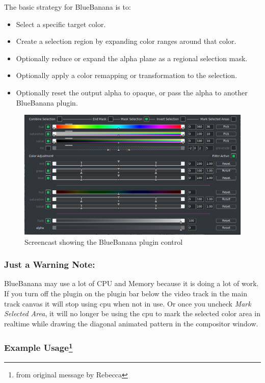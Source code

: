 The basic strategy for BlueBanana is to:

\begin{itemize}
    \item Select a specific target color.
    \item Create a selection region by expanding color ranges around that color.
    \item Optionally reduce or expand the alpha plane as a regional selection mask.
    \item Optionally apply a color remapping or transformation to the selection.
    \item Optionally reset the output alpha to opaque, or pass the alpha to another BlueBanana plugin.
\end{itemize}

\begin{figure}[htpb]
    \centering
    \includegraphics[width=1.0\linewidth]{images/bluebanana.png}
    \caption{Screencast showing the BlueBanana plugin control}
    \label{fig:bluebanana}
\end{figure}

\subsubsection*{Just a Warning Note:}
\label{ssub:warning_note}
BlueBanana may use a lot of CPU and Memory because it is doing a lot of work. If you turn off the plugin on the plugin bar below the video track in the main track canvas it will stop using cpu when not in use. Or once you uncheck \textit{Mark Selected Area}, it will no longer be using the cpu to mark the selected color area in realtime while drawing the diagonal animated pattern in the compositor window.

\subsubsection{Example Usage\protect\footnote{from original message by Rebecca}}
\label{sssec:example_usage}

